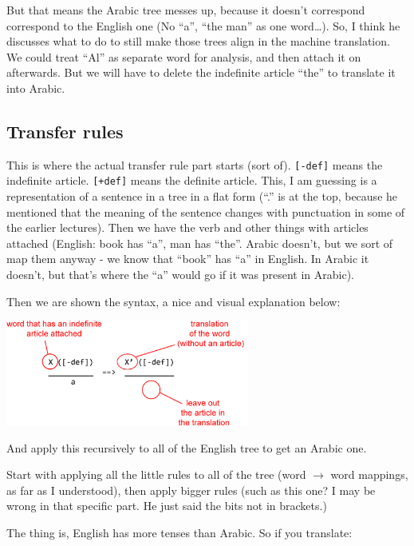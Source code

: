 But that means the Arabic tree messes up, because it doesn't correspond
correspond to the English one (No ``a'', ``the man'' as one word\ldots). So, I 
think he discusses what to do to still make those trees align in the machine
translation.  We could treat ``Al'' as separate word 
for analysis, and then attach it on afterwards. But we will have to delete the 
indefinite article ``the'' to translate it into Arabic.

\subsection{Transfer rules}  
This is where the actual transfer rule part starts (sort of). 
\texttt{[-def]} means the indefinite article. \texttt{[+def]} means the definite
 article. This, I am guessing is a representation of a sentence in a tree in a 
 flat form (``.'' is at the top, because he mentioned that the meaning of the 
 sentence changes with punctuation in some of the earlier lectures). Then we 
 have the verb and other things with articles attached (English: book has ``a'',
  man has ``the''. Arabic doesn't, but we sort of map them anyway - we know that
   ``book'' has ``a'' in English. In Arabic it doesn't, but that's where the 
   ``a'' would go if it was present in Arabic).

 Then we are shown the syntax, a nice and visual explanation 
below: 

\begin{center}
  \includegraphics[width=0.6\textwidth]{images/mt-transfer.jpg}
\end{center}

 And apply this recursively to all of the English tree to get an Arabic one.

Start with applying all the little rules to all of the tree (word $\rightarrow$ 
word mappings, as far as I understood), then apply bigger rules (such as this 
one? I may be wrong in that specific part. He just said the bits not in 
brackets.)

 The thing is, English 
has more tenses than Arabic. So if you translate:

